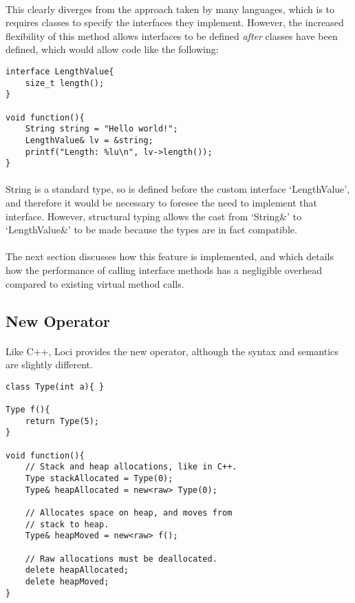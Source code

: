 \documentclass[12pt,twoside,notitlepage]{report}
\begin{document}
\paragraph{}
This clearly diverges from the approach taken by many languages, which is to requires classes to specify the interfaces they implement. However, the increased flexibility of this method allows interfaces to be defined \emph{after} classes have been defined, which would allow code like the following:

\small{
\begin{verbatim}
interface LengthValue{
    size_t length();
}

void function(){
    String string = "Hello world!";
    LengthValue& lv = &string;
    printf("Length: %lu\n", lv->length());
}
\end{verbatim}
}

\paragraph{}
String is a standard type, so is defined before the custom interface `LengthValue', and therefore it would be necessary to foresee the need to implement that interface. However, structural typing allows the cast from `String\&' to `LengthValue\&' to be made because the types are in fact compatible.

\paragraph{}
The next section discusses how this feature is implemented, and which details how the performance of calling interface methods has a negligible overhead compared to existing virtual method calls.

\subsection{New Operator}

\paragraph{}
Like C++, Loci provides the new operator, although the syntax and semantics are slightly different.

\small{
\begin{verbatim}
class Type(int a){ }

Type f(){
    return Type(5);
}

void function(){
    // Stack and heap allocations, like in C++.
    Type stackAllocated = Type(0);
    Type& heapAllocated = new<raw> Type(0);
    
    // Allocates space on heap, and moves from
    // stack to heap.
    Type& heapMoved = new<raw> f();
    
    // Raw allocations must be deallocated.
    delete heapAllocated;
    delete heapMoved;
}
\end{verbatim}
}
\end{document}
